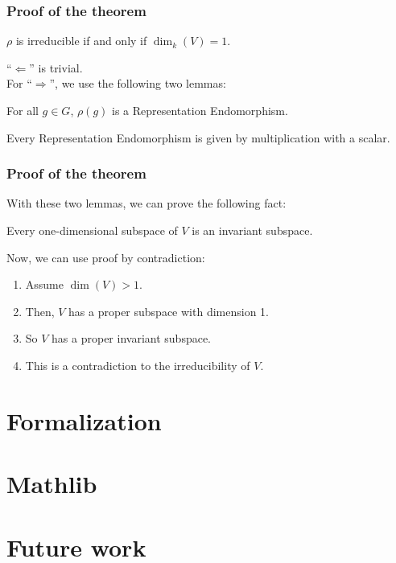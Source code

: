 \documentclass{beamer}
\begin{document}
\begin{frame}
\frametitle{Proof of the theorem}
\begin{theorem}
\(\rho\) is irreducible if and only if \(\dim_k(V) = 1\).
\end{theorem}
\enquote{\(\Leftarrow\)} is trivial.\\
For \enquote{\(\Rightarrow\)}, we use the following two lemmas:
\begin{lemma}
For all \(g \in G\), \(\rho(g)\) is a Representation Endomorphism.
\end{lemma}
\begin{lemma}
Every Representation Endomorphism is given by multiplication with a scalar.
\end{lemma}
\end{frame}


\begin{frame}
\frametitle{Proof of the theorem}
With these two lemmas, we can prove the following fact:
\begin{lemma}
Every one-dimensional subspace of \(V\) is an invariant subspace.
\end{lemma}
\pause
Now, we can use proof by contradiction:
\pause
\begin{enumerate}
\item Assume \(\dim (V) > 1\).
\pause
\item Then, \(V\) has a proper subspace with dimension 1.
\pause
\item So \(V\) has a proper invariant subspace.
\pause
\item This is a contradiction to the irreducibility of \(V\).
\end{enumerate}
\end{frame}

\section{Formalization}
\begin{frame}
\end{frame}

\section{Mathlib}
\begin{frame}
\end{frame}

\section{Future work}
\begin{frame}
\end{frame}
\end{document}
